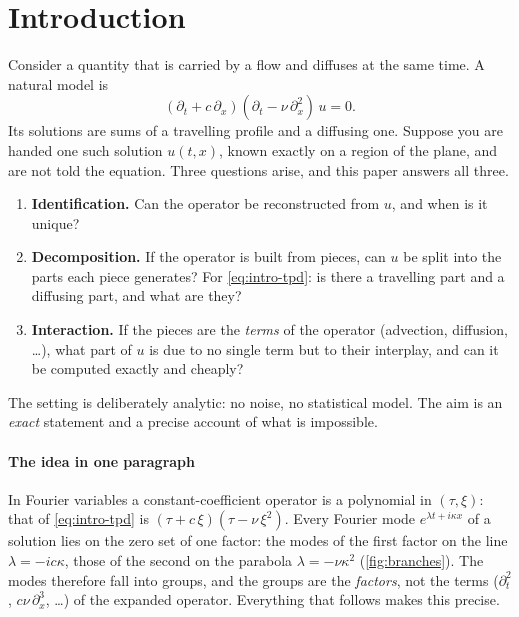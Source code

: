 \documentclass[11pt]{article}
\theoremstyle{plain}
\theoremstyle{definition}
\theoremstyle{remark}
\begin{document}
\section{Introduction}\label{sec:intro}
Consider a quantity that is carried by a flow and diffuses at the same time. A natural model is
\begin{equation}\label{eq:intro-tpd}
  (\partial_t+c\,\partial_x)(\partial_t-\nu\,\partial_x^2)\,u=0 .
\end{equation}
Its solutions are sums of a travelling profile and a diffusing one. Suppose you are handed one such solution $u(t,x)$, known exactly on a region of the plane, and are not told the equation.
Three questions arise, and this paper answers all three.
\begin{enumerate}[label=\textbf{Q\arabic*.},leftmargin=1.1cm,nosep]
\item \textbf{Identification.} Can the operator be reconstructed from $u$, and when is it unique?
\item \textbf{Decomposition.} If the operator is built from pieces, can $u$ be split into the parts each piece generates? For \eqref{eq:intro-tpd}: is there a travelling part and a diffusing part, and what are they?
\item \textbf{Interaction.} If the pieces are the \emph{terms} of the operator (advection, diffusion, \dots), what part of $u$ is due to no single term but to their interplay, and can it be computed exactly and cheaply?
\end{enumerate}
The setting is deliberately analytic: no noise, no statistical model. The aim is an \emph{exact} statement and a precise account of what is impossible.

\paragraph{The idea in one paragraph} In Fourier variables a constant-coefficient operator is a polynomial in $(\tau,\xi)$: that of \eqref{eq:intro-tpd} is $(\tau+c\,\xi)(\tau-\nu\,\xi^2)$. Every Fourier mode
$e^{\lambda t+i\kappa x}$ of a solution lies on the zero set of one factor: the modes of the first factor on the line $\lambda=-ic\kappa$, those of the second on the parabola $\lambda=-\nu\kappa^2$ (\cref{fig:branches}).
The modes therefore fall into groups, and the groups are the \emph{factors}, not the terms ($\partial_t^2$, $c\nu\,\partial_x^3$, \dots) of the expanded operator. Everything that follows makes this precise.
\end{document}
